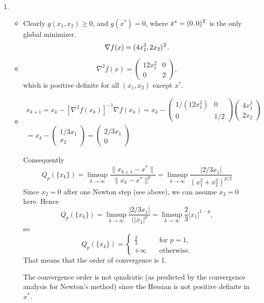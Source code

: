 \begin{enumerate}
  \item
\begin{itemize}
\item Clearly $g(x_1, x_2)\ge 0$, and $g(x^*)=0$, where $x^*=(0,0)^{\text{\upshape T}}$ is the only global minimizer.
\[
\nabla f(x) = ( 4x_1^3, 2x_2)^{\text{\upshape T}}.
\]

\item
\[
\nabla^2 f(x) =
\begin{pmatrix}
12 x_1^2 & 0\\
0 & 2
\end{pmatrix},
\]
which is positive definite for all $(x_1, x_2)$ except $x^*$.

\item
\begin{multline*}
x_{k+1}
= x_k - [\nabla^2 f(x_k)]^{-1} \nabla f(x_k)
= x_k -
\begin{pmatrix}
1/(12 x_1^2) & 0\\
0 & 1/2
\end{pmatrix}
\begin{pmatrix}
4 x_1^3\\
2 x_2
\end{pmatrix}\\
= x_k -
\begin{pmatrix}
1/3 x_1\\
x_2
\end{pmatrix}
=
\begin{pmatrix}
2/3 x_1\\
0
\end{pmatrix}
\end{multline*}

Consequently
\[
Q_p(\{x_k\})
= \limsup_{k\to\infty} \frac{\|x_{k+1}-x^*\|}{\|x_k-x^*\|^p}
= \limsup_{k\to\infty} \frac{|2/3 x_1|}{(x_1^2+x_2^2)^{p/2}}
\]
Since $x_2=0$ after one Newton step (see above), we can assume $x_2=0$ here.
Hence
\[
Q_p(\{x_k\})
= \limsup_{k\to\infty} \frac{|2/3 x_1|}{(|x_1|^p}
= \limsup_{k\to\infty} \frac{2}{3} |x_1|^{1-p},
\]
so
\[
Q_p(\{x_k\})
=
\begin{cases}
\tfrac{2}{3} \quad&\text{for } p=1,\\
+\infty \quad&\text{otherwise.}
\end{cases}
\]
That means that the order of convergence is 1.

The convergence order is not quadratic (as predicted by the convergence
analysis for Newton's method) since the Hessian is not positive definite in
$x^*$.

\end{itemize}
\end{enumerate}

